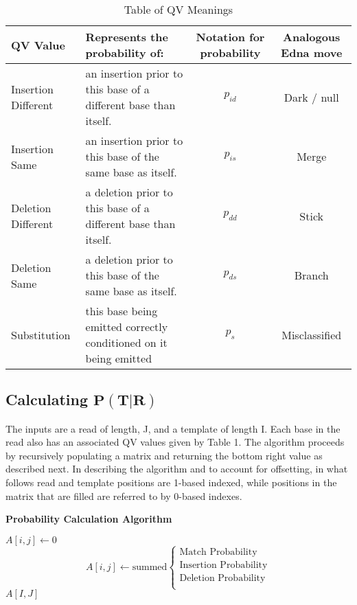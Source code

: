 \documentclass[fleqn,10pt]{SelfArx} %
\begin{document}
\begin{table*}[bt]
\caption{Table of QV Meanings}
\centering
    \begin{tabular}{| l | p{7cm} | c | c |  }
    \toprule
    \hline
    \textbf{QV Value} &  \textbf{Represents the probability of:} &  \textbf{Notation for probability} &  \textbf{Analogous Edna move}  \\ \hline \hline
    Insertion Different & an insertion prior to this base of a different base than itself. & $p_{id}$  & Dark / null \\ \hline
    Insertion Same & an insertion prior to this base of the same base as itself.& $p_{is}$ & Merge \\ \hline
    Deletion Different & a deletion prior to this base of a different base than itself. & $p_{dd}$  & Stick \\ \hline
    Deletion Same & a deletion prior to this base of the same base as itself. & $p_{ds}$  & Branch \\ \hline
    Substitution & this base being emitted correctly conditioned on it being emitted & $p_{s}$  &  Misclassified \\ \hline
    \bottomrule
    \end{tabular}
\end{table*}





\subsection{ Calculating $\mathbf{P(T|R)}$} 

The inputs are a read of length, J, and a template of length I.  Each base in the read also has an associated QV values given by Table 1.   The algorithm proceeds by recursively populating a matrix and returning the bottom right value as described next.  In describing the algorithm and to account for offsetting, in what follows read and template positions are 1-based indexed, while positions in the matrix that are filled are referred to by 0-based indexes. 


\begin{algorithm}
\caption*{\textbf{Probability Calculation Algorithm}}
\label{calcScore}
\begin{algorithmic}[h]
\STATE $A[i,j] \leftarrow 0$
\ELSE
\STATE \[
	A[i,j]  \leftarrow \text{summed}
\begin{cases}
	\text{Match Probability} \\
	\text{Insertion Probability} \\
	\text{Deletion Probability} \\
   	\end{cases}
\]
\ENDIF	
\ENDFOR
\ENDFOR
\RETURN $A[I,J]$
\end{algorithmic}
\end{algorithm}
\end{document}
